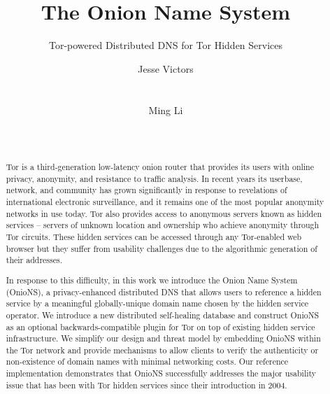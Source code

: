 \documentclass{sig-alternate}
\begin{document}

\title{The Onion Name System}
\subtitle{Tor-powered Distributed DNS for Tor Hidden Services}



\author{
\alignauthor
Jesse Victors \\
       \\
       \\
\alignauthor
Ming Li\\
       \\
       \\
}

\maketitle

\begin{abstract}

Tor is a third-generation low-latency onion router that provides its users with online privacy, anonymity, and resistance to traffic analysis. In recent years its userbase, network, and community has grown significantly in response to revelations of international electronic surveillance, and it remains one of the most popular anonymity networks in use today. Tor also provides access to anonymous servers known as hidden services -- servers of unknown location and ownership who achieve anonymity through Tor circuits. These hidden services can be accessed through any Tor-enabled web browser but they suffer from usability challenges due to the algorithmic generation of their addresses.

In response to this difficulty, in this work we introduce the Onion Name System (OnioNS), a privacy-enhanced distributed DNS that allows users to reference a hidden service by a meaningful globally-unique domain name chosen by the hidden service operator. We introduce a new distributed self-healing database and construct OnioNS as an optional backwards-compatible plugin for Tor on top of existing hidden service infrastructure. We simplify our design and threat model by embedding OnioNS within the Tor network and provide mechanisms to allow clients to verify the authenticity or non-existence of domain names with minimal networking costs. Our reference implementation demonstrates that OnioNS successfully addresses the major usability issue that has been with Tor hidden services since their introduction in 2004.

\end{abstract}
\end{document}
